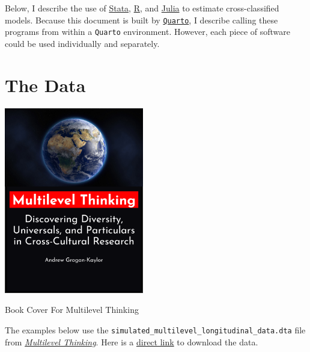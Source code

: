 \documentclass[
  letterpaper,
  DIV=11,
  numbers=noendperiod,
  oneside]{scrreprt}
\begin{document}
Below, I describe the use of \href{https://www.stata.com/}{Stata},
\href{https://www.r-project.org/}{R}, and
\href{https://www.julialang.org/}{Julia} to estimate cross-classified
models. Because this document is built by
\href{https://quarto.org/}{\texttt{Quarto}}, I describe calling these
programs from within a \texttt{Quarto} environment. However, each piece
of software could be used individually and separately.

\hypertarget{the-data-1}{%
\section{The Data}\label{the-data-1}}

\begin{marginfigure}

{\centering \includegraphics[width=2.4in,height=\textheight]{bookcover.png}

}

\caption{\label{fig-bookcover}Book Cover For Multilevel Thinking}

\end{marginfigure}

The examples below use the
\texttt{simulated\_multilevel\_longitudinal\_data.dta} file from
\href{https://agrogan1.github.io/multilevel-thinking/simulated-multi-country-data.html}{\emph{Multilevel
Thinking}}. Here is a
\href{https://github.com/agrogan1/multilevel-multilingual/raw/main/simulated_multilevel_longitudinal_data.dta}{direct
link} to download the data.
\end{document}
